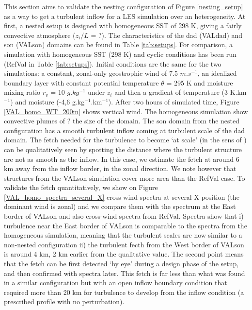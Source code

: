 \documentclass[draft]{agujournal2019} %
\begin{document}
            This section aims to validate the nesting configuration of Figure \ref{nesting_setup} as a way to get a turbulent inflow for a LES simulation over an heterogeneity. At first, a nested setup is designed with homogeneous SST of 298 K, giving a fairly convective atmosphere ($z_i/L$ = ?). The characteristics of the dad (VALdad) and son (VALson) domains can be found in Table \ref{tab:setups}. For comparison, a simulation with homogeneous SST (298 K) and cyclic conditions has been run (RefVal in Table \ref{tab:setups}). Initial conditions are the same for the two simulations: a constant, zonal-only geostrophic wind of 7.5 $m.s^{-1}$, an idealized boundary layer with constant potential temperature $\theta$ = 295 K and moisture mixing ratio $r_v$ = 10 $g.kg^{-1}$ under $z_i$ and then a gradient of temperature (3 K.km$^{-1}$) and moisture  (-4,6 g.kg$^{-1}$.km$^{-1}$). After two hours of simulated time, Figure \ref{VAL_homo_WT_200m} shows vertical wind. The homogeneous simulation show convective plumes of ? the size of the domain. The son domain from the nested configuration has a smooth turbulent inflow coming at turbulent scale of the dad domain. The fetch needed for the turbulence to become `at scale' (in the sens of ) can be qualitatively seen by spotting the distance where the turbulent structure are not as smooth as the inflow. In this case, we estimate the fetch at around 6 km away from the inflow border, in the zonal direction. We note however that structures from the VALson simulation cover more area than the RefVal case. To validate the fetch quantitatively, we show on Figure \ref{VAL_homo_spectra_several_X} cross-wind spectra at several X position (the dominant wind is zonal) and we compare them with the spectrum at the East border of VALson and also cross-wind spectra from RefVal. Spectra show that i) turbulence near the East border of VALson is comparable to the spectra from the homogeneous simulation, meaning that the turbulent scales are now similar to a non-nested configuration ii) the turbulent fecth from the West border of VALson is around 4 km, 2 km earlier from the qualitative value. The second point means that the fetch can be first detected `by eye' during a design phase of the setup, and then confirmed with spectra later. This fetch is far less than what was found in a similar configuration but with an open inflow boundary condition that required more than 20 km for turbulence to develop from the inflow condition (a prescribed profile with no perturbation).     
            
\end{document}
